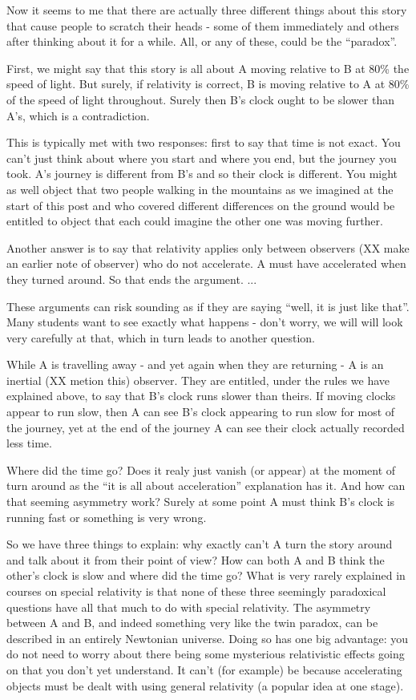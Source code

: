 \documentclass[a4paper]{report}
\begin{document}
Now it seems to me that there are actually three different things about this story that cause people to scratch their heads - some of them immediately and others after thinking about it for a while. All, or any of these, could be the ``paradox''.

First, we might say that this story is all about A moving relative to B at 80\% the speed of light. But surely, if relativity is correct, B is moving relative to A at 80\% of the speed of light throughout. Surely then B's clock ought to be slower than A's, which is a contradiction.

This is typically met with two responses: first to say that time is not exact. You can't just think about where you start and where you end, but the journey you took. A's journey is different from B's and so their clock is different. You might as well object that two people walking in the mountains as we imagined at the start of this post and who covered different differences on the ground would be entitled to object that each could imagine the other one was moving further.

Another answer is to say that relativity applies only between observers (XX make an earlier note of observer) who do not accelerate. A must have accelerated when they turned around. So that ends the argument. ...

These arguments can risk sounding as if they are saying ``well, it is just like that''. Many students want to see exactly what happens - don't worry, we will will look very carefully at that, which in turn leads to another question.

While A is travelling away - and yet again when they are returning - A is an inertial (XX metion this) observer. They are entitled, under the rules we have explained above, to say that B's clock runs slower than theirs. If moving clocks appear to run slow, then A can see B's clock appearing to run slow for most of the journey, yet at the end of the journey A can see their clock actually recorded less time.

Where did the time go? Does it realy just vanish (or appear) at the moment of turn around as the ``it is all about acceleration'' explanation has it.  And how can that seeming asymmetry work? Surely at some point A must think B's clock is running fast or something is very wrong.

So we have three things to explain: why exactly can't A turn the story around and talk about it from their point of view? How can both A and B think the other's clock is slow and where did the time go? What is very rarely explained in courses on special relativity is that none of these three seemingly paradoxical questions have all that much to do with special relativity. The asymmetry between A and B, and indeed something very like the twin paradox, can be described in an entirely Newtonian universe. Doing so has one big advantage: you do not need to worry about there being some mysterious relativistic effects going on that you don't yet understand. It can't (for example) be because accelerating objects must be dealt with using general relativity (a popular idea at one stage).
\end{document}
